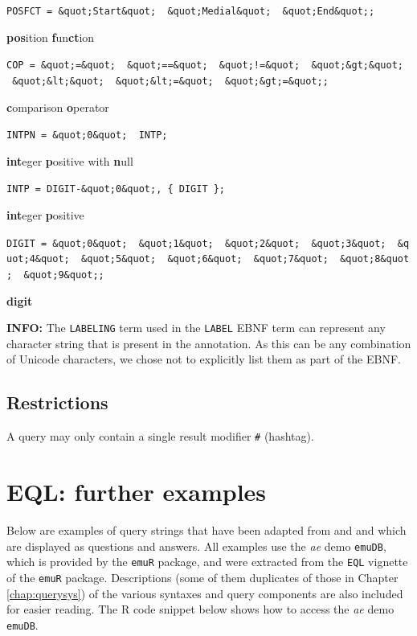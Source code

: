 \documentclass[]{book}
\begin{document}
\texttt{POSFCT\ =\ \&quot;Start\&quot;\ \textbar{}\ \&quot;Medial\&quot;\ \textbar{}\ \&quot;End\&quot;;}

\textbf{pos}ition \textbf{f}un\textbf{ct}ion

\texttt{COP\ =\ \&quot;=\&quot;\ \textbar{}\ \&quot;==\&quot;\ \textbar{}\ \&quot;!=\&quot;\ \textbar{}\ \&quot;\&gt;\&quot;\ \textbar{}\ \&quot;\&lt;\&quot;\ \textbar{}\ \&quot;\&lt;=\&quot;\ \textbar{}\ \&quot;\&gt;=\&quot;;}

\textbf{c}omparison \textbf{o}perator

\texttt{INTPN\ =\ \&quot;0\&quot;\ \textbar{}\ INTP;}

\textbf{int}eger \textbf{p}ositive with \textbf{n}ull

\texttt{INTP\ =\ DIGIT-\&quot;0\&quot;,\ \{\ DIGIT\ \};}

\textbf{int}eger \textbf{p}ositive

\texttt{DIGIT\ =\ \&quot;0\&quot;\ \textbar{}\ \&quot;1\&quot;\ \textbar{}\ \&quot;2\&quot;\ \textbar{}\ \&quot;3\&quot;\ \textbar{}\ \&quot;4\&quot;\ \textbar{}\ \&quot;5\&quot;\ \textbar{}\ \&quot;6\&quot;\ \textbar{}\ \&quot;7\&quot;\ \textbar{}\ \&quot;8\&quot;\ \textbar{}\ \&quot;9\&quot;;}

\textbf{digit}

\textbf{INFO:} The \texttt{LABELING} term used in the \texttt{LABEL} EBNF term can represent any character string that is present in the annotation. As this can be any combination of Unicode characters, we chose not to explicitly list them as part of the EBNF.

\hypertarget{restrictions}{%
\section{Restrictions}\label{restrictions}}

A query may only contain a single result modifier \texttt{\#} (hashtag).

\hypertarget{app-chap:eql}{%
\chapter{EQL: further examples}\label{app-chap:eql}}

Below are examples of query strings that have been adapted from \citet{cassidy:sc2001a} and \citet{harrington:2002aa} and which are displayed as questions and answers. All examples use the \emph{ae} demo \texttt{emuDB}, which is provided by the \texttt{emuR} package, and were extracted from the \texttt{EQL} vignette of the \texttt{emuR} package. Descriptions (some of them duplicates of those in Chapter \ref{chap:querysys}) of the various syntaxes and query components are also included for easier reading. The R code snippet below shows how to access the \emph{ae} demo \texttt{emuDB}.
\end{document}
